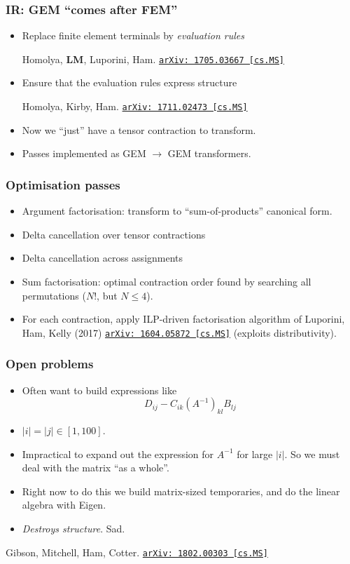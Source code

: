 \documentclass[presentation]{beamer}
\newcommand{\arxivlink}[2]{%
  \href{http://www.arxiv.org/abs/#1}%
  {\texttt{arXiv:\,#1\,[#2]}}%
}
\begin{document}
\begin{frame}
  \frametitle{IR: GEM ``comes after FEM''}
  \begin{itemize}
  \item Replace finite element terminals by \emph{evaluation rules}
    \begin{flushright}
      {\footnotesize Homolya, \textbf{LM}, Luporini,
        Ham. \arxivlink{1705.03667}{cs.MS}}
    \end{flushright}
  \item Ensure that the evaluation rules express structure
    \begin{flushright}
      {\footnotesize Homolya, Kirby, Ham. \arxivlink{1711.02473}{cs.MS}}
    \end{flushright}
    
  \item Now we ``just'' have a tensor contraction to transform.
  \item Passes implemented as GEM $\to$ GEM transformers.
  \end{itemize}
\end{frame}

\begin{frame}
  \frametitle{Optimisation passes}
  \begin{itemize}
  \item Argument factorisation: transform to ``sum-of-products''
    canonical form.
  \item Delta cancellation over tensor contractions
  \item Delta cancellation across assignments
  \item Sum factorisation: optimal contraction order found by
    searching all permutations ($N!$, but $N\le 4$).
  \item For each contraction, apply ILP-driven factorisation algorithm of
    {\footnotesize Luporini, Ham, Kelly (2017) \arxivlink{1604.05872}{cs.MS}}
    (exploits distributivity).
  \end{itemize}
\end{frame}
\begin{frame}
  \frametitle{Open problems}
  \begin{itemize}
  \item Often want to build expressions like
    \begin{equation*}
      D_{ij} - C_{ik} (A^{-1})_{k l} B_{l j}
    \end{equation*}
  \item $|i| = |j| \in [1, 100]$.
  \item Impractical to expand out the expression for $A^{-1}$ for
    large $|i|$.  So we must deal with the matrix ``as a whole''.
  \item Right now to do this we build matrix-sized temporaries, and do
    the linear algebra with Eigen.
  \item \emph{Destroys structure}.  Sad.
  \end{itemize}
    \begin{flushright}
      {\footnotesize Gibson, Mitchell, Ham, Cotter. \arxivlink{1802.00303}{cs.MS}}
    \end{flushright}
\end{frame}
\end{document}
